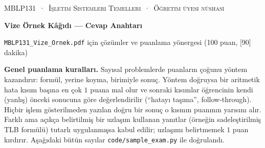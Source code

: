 \documentclass[11pt,a4paper]{article}
\begin{document}
\setlength{\emergencystretch}{3em}
\newcommand{\gantt}[2]{%
\begin{tikzpicture}[x=#1cm,y=1cm]
\foreach \p/\a/\b in {#2} {
  \fill[col\p] (\a,0) rectangle (\b,0.62);
  \draw[white,line width=1.2pt] (\a,0) -- (\a,0.62);
  \node[font=\small\bfseries,text=txt\p] at ({(\a+\b)/2},0.31) {\p};
  \draw[muted] (\a,0) -- (\a,-0.1) node[below,font=\scriptsize,text=muted,inner sep=1.5pt] {\a};
  \draw[muted] (\b,0) -- (\b,-0.1) node[below,font=\scriptsize,text=muted,inner sep=1.5pt] {\b};
}
\end{tikzpicture}}
\newcommand{\gen}[1]{}

\thispagestyle{empty}
\begin{tcolorbox}[enhanced,colback=dark,colframe=dark,arc=0pt,boxrule=0pt,
  left=18pt,right=18pt,top=14pt,bottom=14pt,coltext=white]
{\small\color{mint}\textsc{MBLP131 \,·\, İşletim Sistemleri Temelleri \,·\, Öğretim üyesi nüshası}}\par\smallskip
{\headfont\fontsize{22}{26}\selectfont\bfseries Vize Örnek Kâğıdı --- Cevap Anahtarı}\par\smallskip
{\small \texttt{MBLP131\_Vize\_Ornek.pdf} için çözümler ve puanlama yönergesi (100 puan, [90] dakika)}
\end{tcolorbox}

\textbf{Genel puanlama kuralları.} Sayısal problemlerde puanların çoğunu yöntem kazandırır: formül, yerine koyma, birimiyle sonuç. Yöntem doğruysa bir aritmetik hata kısım başına en çok $1$ puana mal olur ve sonraki kısımlar öğrencinin kendi (yanlış) önceki sonucuna göre değerlendirilir (``hatayı taşıma'', follow-through). Hiçbir işlem gösterilmeden yazılan doğru bir sonuç o kısmın puanının yarısını alır. Farklı ama açıkça belirtilmiş bir uzlaşım kullanan yanıtlar (örneğin sadeleştirilmiş TLB formülü) tutarlı uygulanmışsa kabul edilir; uzlaşımı belirtmemek $1$ puan kırdırır. Aşağıdaki bütün sayılar \texttt{code/sample\_exam.py} ile doğrulandı.
\end{document}
